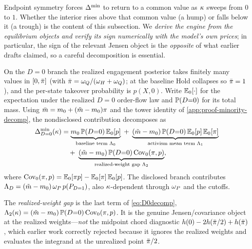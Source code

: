 Endpoint symmetry forces $\Delta^{\min}$ to return to a common value as $\kappa$ sweeps from
$0$ to $1$. Whether the interior rises above that common value (a hump) or falls
below it (a trough) is the content of this subsection. We \emph{derive the engine
from the equilibrium objects and verify its sign numerically with the model's own
prices}; in particular, the sign of the relevant Jensen object is the
\emph{opposite} of what earlier drafts claimed, so a careful decomposition is
essential.

On the $D=0$ branch the realized engagement posterior takes finitely many values
in $[0,\bar{\pi}]$ (with $\bar{\pi}=\omega_Q/(\omega_H+\omega_Q)$; at the baseline Hold
collapses so $\bar{\pi}=1$), and the per-state takeover probability is $p(X,0)$.
Write $\mathbb{E}_0[\cdot]$ for the expectation under the realized $D=0$ order-flow law
and $\mathbb{P}(D{=}0)$ for its total mass. Using $\bar{m}=m_0+(\tilde{m}-m_0)\pi$ and the tower
identity of \ref{app:proof-minority-decomp}, the nondisclosed contribution
decomposes as
\begin{equation}
\label{eq:D0decomp}
\begin{aligned}
\Delta^{\min}_{D=0}(\kappa)
&=\underbrace{m_0\,\mathbb{P}(D{=}0)\,\mathbb{E}_0[p]}_{\text{baseline term }\Lambda_{0}}
\;+\;\underbrace{(\tilde{m}-m_0)\,\mathbb{P}(D{=}0)\,\mathbb{E}_0[p]\,\mathbb{E}_0[\pi]}_{\text{activism mean term }\Lambda_{1}}\\
&\quad+\;\underbrace{(\tilde{m}-m_0)\,\mathbb{P}(D{=}0)\,\mathrm{Cov}_0(\pi,p)}_{\text{realized-weight gap }\Lambda_{2}},
\end{aligned}
\end{equation}
where $\mathrm{Cov}_0(\pi,p)=\mathbb{E}_0[\pi p]-\mathbb{E}_0[\pi]\,\mathbb{E}_0[p]$. The disclosed branch
contributes $\Lambda_D=(\tilde{m}-m_0)\,\omega_P\,p(P_{D=1})$, also $\kappa$-dependent through
$\omega_P$ and the cutoffs.

\begin{definition}
\label{def:Lambda2}
The \emph{realized-weight gap} is the last term of \eqref{eq:D0decomp},
$\Lambda_2(\kappa)=(\tilde{m}-m_0)\,\mathbb{P}(D{=}0)\,\mathrm{Cov}_0(\pi,p)$. It is the genuine
Jensen/covariance object at the realized weights---\emph{not} the midpoint chord
diagnostic $h(0)-2h(\bar{\pi}/2)+h(\bar{\pi})$, which earlier work correctly rejected
because it ignores the realized weights and evaluates the integrand at the
unrealized point $\bar{\pi}/2$.
\end{definition}

